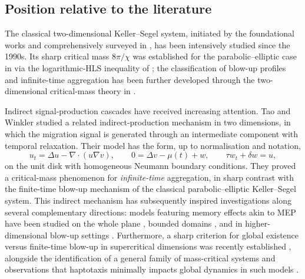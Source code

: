 \documentclass[11pt,reqno]{amsart}
\theoremstyle{definition}
\theoremstyle{remark}
\newcommand{\Div}{\nabla\!\cdot}
\begin{document}
\subsection{Position relative to the literature}
\label{subsec:position}

The classical two-dimensional Keller--Segel system, initiated by the foundational works \cite{keller1970initiation,keller1971model} and comprehensively surveyed in \cite{horstmann20031970,hillen2009user,bellomo2015toward,wang2025analysis,winkler2016two}, has been intensively studied since the 1990s. Its sharp critical mass $8\pi/\chi$ was established for the parabolic--elliptic case in \cite{blanchet2006two} via the logarithmic-HLS inequality of \cite{beckner1993sharp}; the classification of blow-up profiles and infinite-time aggregation has been further developed through the two-dimensional critical-mass theory in \cite{blanchet2008infinite,liang2025global,raphael2014stability,nagai1997application}.

Indirect signal-production cascades have received increasing attention. Tao and Winkler \cite{tao2017critical} studied a related indirect-production mechanism in two dimensions, in which the migration signal is generated through an intermediate component with temporal relaxation. Their model has the form, up to normalisation and notation,
\[
        u_t=\Delta u-\Div(u\nabla v),
        \qquad
        0=\Delta v-\mu(t)+w,
        \qquad
        \tau w_t+\delta w=u,
\]
on the unit disk with homogeneous Neumann boundary conditions. They proved a critical-mass phenomenon for \emph{infinite-time} aggregation, in sharp contrast with the finite-time blow-up mechanism of the classical parabolic--elliptic Keller--Segel system. This indirect mechanism has subsequently inspired investigations along several complementary directions: models featuring memory effects akin to MEP have been studied on the whole plane \cite{xiang2025critical}, bounded domains \cite{yang2026critical,laurenccot2024singular,wang2025analysis1}, and in higher-dimensional blow-up settings \cite{mao2025critical,mao2025finite,mao2025finite1,wang2026damage}. Furthermore, a sharp criterion for global existence versus finite-time blow-up in supercritical dimensions was recently established \cite{soga2026sharp}, alongside the identification of a general family of mass-critical systems \cite{winkler2022family,yu2026pattern} and observations that haptotaxis minimally impacts global dynamics in such models \cite{chen2024negligibility}.
\end{document}
